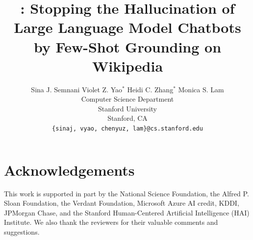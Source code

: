 \documentclass[11pt]{article}
\title{\system: Stopping the Hallucination of Large Language Model Chatbots \\ by Few-Shot Grounding on Wikipedia}
\author{Sina J. Semnani \quad Violet Z. Yao$^*$ \quad Heidi C. Zhang$^*$ \quad  Monica S. Lam \\
        Computer Science Department \\ Stanford University \\ Stanford, CA \\
        \texttt{\{sinaj, vyao, chenyuz, lam\}@cs.stanford.edu}}
\begin{document}
\maketitle
\def\thefootnote{*}
\def\thefootnote{\arabic{footnote}}

\begin{abstract}

\end{abstract}











\section*{Acknowledgements}
This work is supported in part by the National Science Foundation, the Alfred P. Sloan Foundation, the Verdant Foundation, Microsoft Azure AI credit, KDDI, JPMorgan Chase, and the Stanford Human-Centered Artificial Intelligence (HAI) Institute. We also thank the reviewers for their valuable comments and suggestions. 




\appendix

\end{document}
